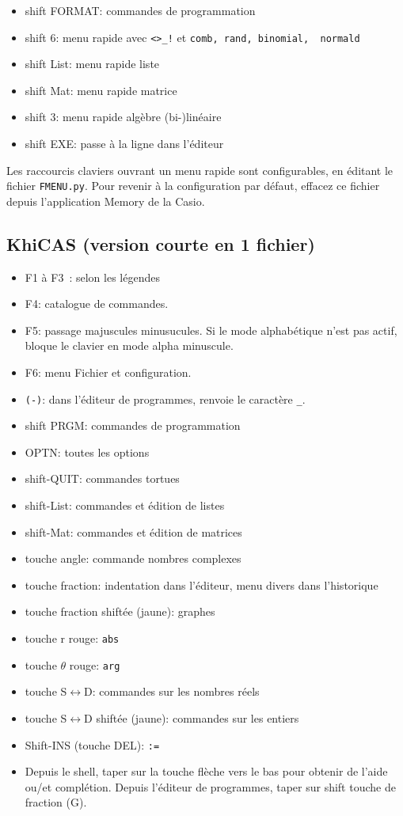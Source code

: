 \documentclass{article}
\begin{document}
\begin{giacjshere}
\begin{itemize}
\item shift FORMAT: commandes de programmation
\item shift 6: menu rapide avec \verb|<>_!| et \verb|comb, rand, binomial,  normald|
\item shift List: menu rapide liste
\item shift Mat: menu rapide matrice
\item shift 3: menu rapide alg\`ebre (bi-)lin\'eaire
\item shift EXE: passe \`a la ligne dans l'\'editeur
\end{itemize}
Les raccourcis claviers ouvrant un menu rapide sont configurables, en
\'editant le fichier \verb|FMENU.py|. Pour revenir \`a la
configuration par d\'efaut, effacez ce fichier depuis l'application
Memory de la Casio.

\subsection{KhiCAS (version courte en 1 fichier)}
\begin{itemize}
\item F1 \`a F3~: selon  les l\'egendes
\item F4: catalogue de commandes.
\item F5: passage majuscules minusucules. Si le mode alphab\'etique
n'est pas actif, bloque le clavier en mode alpha minuscule.
\item F6: menu Fichier et configuration.
\item \verb|(-)|: dans l'\'editeur de programmes,
renvoie le caract\`ere \verb|_|. 
\item shift PRGM: commandes de programmation
\item OPTN: toutes les options 
\item shift-QUIT: commandes tortues
\item shift-List: commandes et \'edition de listes
\item shift-Mat: commandes et \'edition de matrices
\item touche angle: commande nombres complexes
\item touche fraction: indentation dans l'\'editeur, menu
divers dans l'historique
\item touche fraction shift\'ee (jaune): graphes
\item touche r rouge: \verb|abs|
\item touche $\theta$ rouge: \verb|arg|
\item touche S$\leftrightarrow$D: commandes sur les nombres r\'eels
\item touche S$\leftrightarrow$D shift\'ee (jaune): commandes sur les entiers
\item Shift-INS (touche DEL): \verb|:=|
\item Depuis le shell, taper sur la touche fl\`eche vers le bas 
pour obtenir de l'aide ou/et compl\'etion.
Depuis l'\'editeur de programmes, taper sur shift touche de fraction (G).
\end{itemize}


\end{giacjshere}
\end{document}
